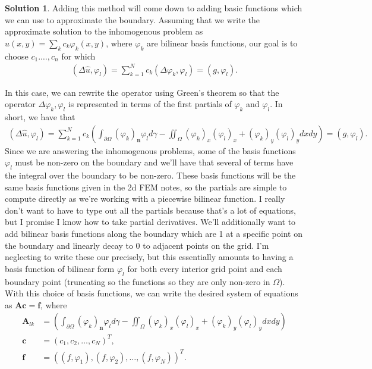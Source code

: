 \documentclass[12pt]{article}
\renewcommand{\vec}[1]{\mathbf{#1}}
\renewcommand{\phi}{\varphi}
\theoremstyle{definition}
\newtheorem{sol}{Solution}
\theoremstyle{remark}
\begin{document}
\begin{sol}
    Adding this method will come down to adding basic functions which we can use to approximate the boundary. Assuming that we write the approximate solution to the inhomogenous problem as $\hat{u}(x,y) = \sum_{k} c_{k} \phi_{k}(x,y)$, where $\phi_{k}$ are bilinear basis functions,  our goal is to choose $c_{1}. \ldots, c_{n}$ for which
    \begin{align*}
        (\Delta \hat{u}, \phi_{l}) = \sum_{k=1}^{N} c_{k} (\Delta \phi_{k}, \phi_{l}) = (g, \phi_{l}).
    \end{align*}

    In this case, we can rewrite the operator using Green's theorem so that the operator $\Delta \phi_{k}, \phi_{l}$ is represented in terms of the first partials of $\phi_{k}$ and $\phi_{l}$. In short, we have that
    \begin{align*}
        (\Delta \hat{u}, \phi_{l}) = \sum_{k = 1}^{N} c_{k} \left(\int_{\partial \Omega} (\phi_{k})_{\vec{n}} \phi_{l} d\gamma -  \iint_{\Omega} (\phi_{k})_{x} (\phi_{l})_{x} + (\phi_{k})_{y} (\phi_{l})_{y} dx dy \right) = (g, \phi_{l}).
    \end{align*}
    Since we are answering the inhomogenous problems, some of the basis functions $\phi_{l}$ must be non-zero on the boundary and we'll have that several of terms have the integral over the boundary to be non-zero. These basis functions will be the same basis functions given in the 2d FEM notes, so the partials are simple to compute directly as we're working with a piecewise bilinear function. I really don't want to have to type out all the partials because that's a lot of equations, but I promise I know how to take partial derivatives. We'll additionally want to add bilinear basis functions along the boundary which are 1 at a specific point on the boundary and linearly decay to 0 to adjacent points on the grid. I'm neglecting to write these our precisely, but this essentially amounts to having a basis function of bilinear form $\phi_{l}$ for both every interior grid point and each boundary point (truncating so the functions so they are only non-zero in $\Omega$). With this choice of basis functions, we can write the desired system of equations as $\vec{A}\vec{c} = \vec{f}$, where 
    \begin{align*}
        \vec{A}_{lk} &= \left(\int_{\partial \Omega} (\phi_{k})_{\vec{n}} \phi_{l} d\gamma -  \iint_{\Omega} (\phi_{k})_{x} (\phi_{l})_{x} + (\phi_{k})_{y} (\phi_{l})_{y} dx dy \right) \\
        \vec{c} &= (c_{1}, c_{2}, \ldots, c_{N})^{T},\\
        \vec{f} &= ( (f, \phi_{1}), (f, \phi_{2}), \ldots, (f, \phi_{N}) )^{T}.
    \end{align*}
\end{sol}
\end{document}
